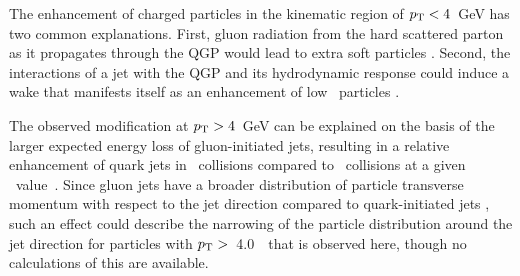 The enhancement of charged particles in the kinematic region of \mbox{$\mbox{$p_{\mathrm{T}}$} < 4$ GeV} has two common explanations.
First, gluon radiation from the hard scattered parton as it propagates through the QGP would lead to extra soft particles \cite{Chien:2015vja, Kang:2017frl}.
Second, the interactions of a jet with the QGP and its hydrodynamic response could induce a wake that manifests itself as an enhancement of low \pt\ particles \cite{Tachibana:2017syd}.

The observed modification at \mbox{$\mbox{$p_{\mathrm{T}}$} > 4$ GeV} can be explained on the basis of the larger expected energy loss of gluon-initiated jets, resulting in a relative enhancement of quark jets in \pbpb\ collisions compared to \pp\ collisions at a given \ptjet\ value~\cite{PhysRevC.98.024908, Spousta:2015fca}.
Since gluon jets have a broader distribution of particle transverse momentum with respect to the jet direction compared to quark-initiated jets \cite{OPAL:1995ab}, such an effect could describe the narrowing of the particle distribution around the jet direction for particles with $\mbox{$p_{\mathrm{T}}$} >$~4.0~\GeV\ that is observed here, though no calculations of this are available.


